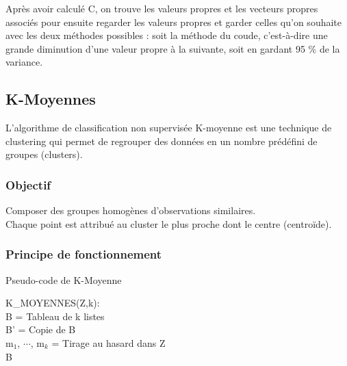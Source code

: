 \documentclass[a4paper,12pt]{article}
\begin{document}
Après avoir calculé C, on trouve les valeurs propres et les vecteurs propres associés pour ensuite regarder les valeurs propres et garder celles qu'on souhaite avec les deux méthodes possibles : soit la méthode du coude, c'est-à-dire une grande diminution d'une valeur propre à la suivante, soit en gardant 95 \% de la variance.


\subsection{K-Moyennes}
L'algorithme de classification non supervisée K-moyenne est une technique de clustering qui permet de regrouper des données en un nombre prédéfini de groupes (clusters).

\subsubsection{Objectif}
Composer des groupes homogènes d'observations similaires.\\

Chaque point est attribué au cluster le plus proche dont le centre (centroïde).

\subsubsection{Principe de fonctionnement}

\begin{algorithm}
  \caption{Pseudo-code de K-Moyenne}
  K\_MOYENNES(Z,k):\\
  B = Tableau de k listes  \\
  B' = Copie de B\\
  m$_1$, $\cdots$, m$_k$ = Tirage au hasard dans Z\\
  \Return B
\end{algorithm}
\end{document}
